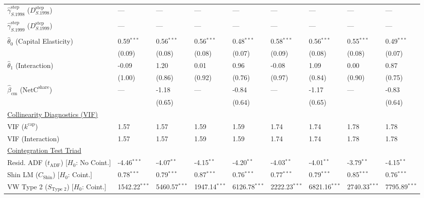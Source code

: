 \begin{table}[H]
\begin{tabular}{p{3.8cm}p{1.35cm}p{1.35cm}p{1.35cm}p{1.35cm}p{1.35cm}p{1.35cm}p{1.35cm}p{1.35cm}}
$\hat{\gamma}^{\text{step}}_{S.1998}$ ($D^{\text{step}}_{S.1998}$)  & --- & --- & --- & --- & --- & --- & --- & ---  \\
 &  &  &  &  &  &  &  &   \\
$\hat{\gamma}^{\text{step}}_{S.1999}$ ($D^{\text{step}}_{S.1999}$)  & --- & --- & --- & --- & --- & --- & --- & ---  \\
 &  &  &  &  &  &  &  &   \\
[1ex]
$\hat{\theta}_0$ (Capital Elasticity)  & 0.59$^{***}$ & 0.56$^{***}$ & 0.56$^{***}$ & 0.48$^{***}$ & 0.58$^{***}$ & 0.56$^{***}$ & 0.55$^{***}$ & 0.49$^{***}$  \\
 & {\scriptsize (0.09)} & {\scriptsize (0.08)} & {\scriptsize (0.08)} & {\scriptsize (0.07)} & {\scriptsize (0.09)} & {\scriptsize (0.08)} & {\scriptsize (0.08)} & {\scriptsize (0.07)}  \\
$\hat{\theta}_1$ (Interaction)  & -0.09 & 1.20 & 0.01 & 0.96 & -0.08 & 1.09 & 0.00 & 0.87  \\
 & {\scriptsize (1.00)} & {\scriptsize (0.86)} & {\scriptsize (0.92)} & {\scriptsize (0.76)} & {\scriptsize (0.97)} & {\scriptsize (0.84)} & {\scriptsize (0.90)} & {\scriptsize (0.75)}  \\
$\hat{\beta}_{\text{cm}}$ ($\text{NetC}^{\text{share}}$)  & --- & -1.18 & --- & -0.84 & --- & -1.17 & --- & -0.83  \\
 &  & {\scriptsize (0.65)} &  & {\scriptsize (0.64)} &  & {\scriptsize (0.65)} &  & {\scriptsize (0.64)}  \\
\midrule
\multicolumn{9}{l}{\underline{Collinearity Diagnostics (VIF)}} \\
VIF ($k^{\text{cap}}$) & 1.57 & 1.57 & 1.59 & 1.59 & 1.74 & 1.74 & 1.78 & 1.78  \\
VIF (Interaction) & 1.57 & 1.57 & 1.59 & 1.59 & 1.74 & 1.74 & 1.78 & 1.78  \\
\midrule
\multicolumn{9}{l}{\underline{Cointegration Test Triad}} \\
\makecell[l]{Resid. ADF ($t_{\text{ADF}}$) \\ {\scriptsize [$H_0$: No Coint.]}} & -4.46$^{***}$ & -4.07$^{**}$ & -4.15$^{**}$ & -4.20$^{**}$ & -4.03$^{**}$ & -4.01$^{**}$ & -3.79$^{**}$ & -4.15$^{**}$  \\
\makecell[l]{Shin LM ($C_{\text{Shin}}$) \\ {\scriptsize [$H_0$: Coint.]}} & 0.78$^{***}$ & 0.79$^{***}$ & 0.87$^{***}$ & 0.76$^{***}$ & 0.77$^{***}$ & 0.79$^{***}$ & 0.85$^{***}$ & 0.76$^{***}$  \\
\makecell[l]{VW Type 2 ($S_{\text{Type 2}}$) \\ {\scriptsize [$H_0$: Coint.]}} & 1542.22$^{***}$ & 5460.57$^{***}$ & 1947.14$^{***}$ & 6126.78$^{***}$ & 2222.23$^{***}$ & 6821.16$^{***}$ & 2740.33$^{***}$ & 7795.89$^{***}$  \\

\end{tabular}
\end{table}
